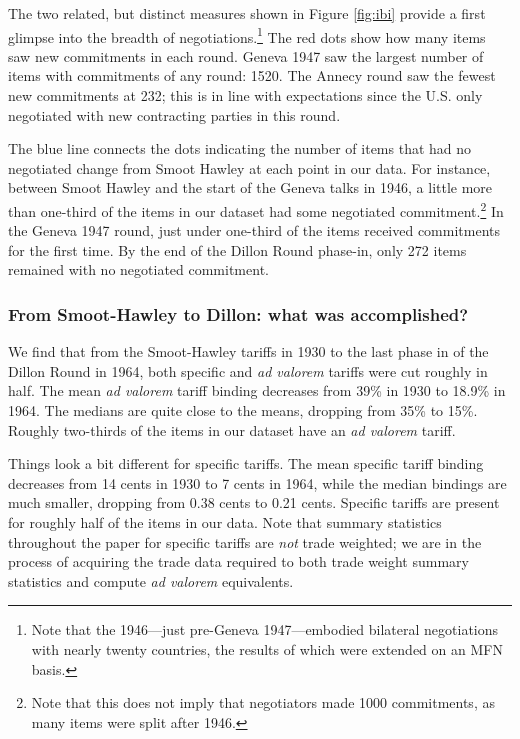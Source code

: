 \documentclass[
  12pt,
]{article}
\begin{document}
The two related, but distinct measures shown in Figure \ref{fig:ibi} provide a first glimpse into the breadth of negotiations.\footnote{Note that the 1946---just pre-Geneva 1947---embodied bilateral negotiations with nearly twenty countries, the results of which were extended on an MFN basis.} The red dots show how many items saw new commitments in each round. Geneva 1947 saw the largest number of items with commitments of any round: 1520. The Annecy round saw the fewest new commitments at 232; this is in line with expectations since the U.S. only negotiated with new contracting parties in this round.

The blue line connects the dots indicating the number of items that had no negotiated change from Smoot Hawley at each point in our data. For instance, between Smoot Hawley and the start of the Geneva talks in 1946, a little more than one-third of the items in our dataset had some negotiated commitment.\footnote{Note that this does not imply that negotiators made 1000 commitments, as many items were split after 1946.} In the Geneva 1947 round, just under one-third of the items received commitments for the first time. By the end of the Dillon Round phase-in, only 272 items remained with no negotiated commitment.

\hypertarget{from-smoot-hawley-to-dillon-what-was-accomplished}{%
\subsubsection{From Smoot-Hawley to Dillon: what was accomplished?}\label{from-smoot-hawley-to-dillon-what-was-accomplished}}

We find that from the Smoot-Hawley tariffs in 1930 to the last phase in of the Dillon Round in 1964, both specific and \emph{ad valorem} tariffs were cut roughly in half. The mean \emph{ad valorem} tariff binding decreases from 39\% in 1930 to 18.9\% in 1964. The medians are quite close to the means, dropping from 35\% to 15\%. Roughly two-thirds of the items in our dataset have an \emph{ad valorem} tariff.

Things look a bit different for specific tariffs. The mean specific tariff binding decreases from 14 cents in 1930 to 7 cents in 1964, while the median bindings are much smaller, dropping from 0.38 cents to 0.21 cents. Specific tariffs are present for roughly half of the items in our data. Note that summary statistics throughout the paper for specific tariffs are \emph{not} trade weighted; we are in the process of acquiring the trade data required to both trade weight summary statistics and compute \emph{ad valorem} equivalents.
\end{document}
